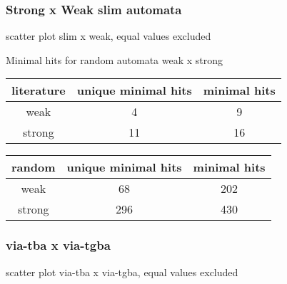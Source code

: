 \documentclass[
	digital
nolof, nolot
]{fithesis3}
\begin{document}
	\clearpage
	\subsubsection{Strong x Weak slim automata}
		\begin{table}[ht]
			\centering 
			\caption{scatter plot slim x weak, equal values excluded}
		
		\begin{tikzpicture}
			
		\end{tikzpicture}
	\end{table}
	
		{Minimal hits for random automata weak x strong
		\begin{table}[ht]
			\centering
			\begin{tabular}{ |c|c|c| } 
				\hline
				literature&unique minimal hits&minimal hits\\
				\hline
				weak&4 & 9\\
				\hline
				strong&11 & 16\\ 
				\hline
			\end{tabular}
		\end{table}
	\begin{table}[ht]
		\begin{tabular}{ |c|c|c| } 
			\hline
			random&unique minimal hits&minimal hits\\
			\hline
			weak&68 & 202\\
			\hline
			strong&296 & 430\\ 
			\hline
		\end{tabular}
	\end{table}
		
		\clearpage
		\subsubsection{via-tba x via-tgba}
		\begin{table}[ht]
		\caption{scatter plot via-tba x via-tgba, equal values excluded}
		\begin{tikzpicture}
			
		\end{tikzpicture}
	\end{table}
		
}
\end{document}
